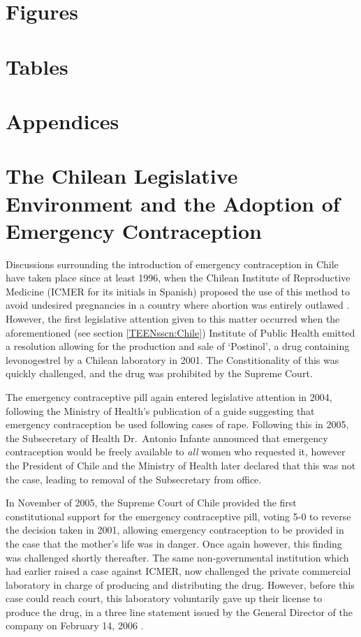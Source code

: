 \newpage
\section*{Figures}

\clearpage

\section*{Tables}

\newpage

\biblioinc

\newpage
\appendix
\section*{Appendices}
\section{The Chilean Legislative Environment and the Adoption of Emergency
Contraception}
\label{TEENscn:applegislate}
Discussions surrounding the introduction of emergency contraception in Chile
have taken place since at least 1996, when the Chilean Institute of 
Reproductive Medicine (ICMER for its initials in Spanish) proposed the use of
this method to avoid undesired pregnancies in a country where abortion was
entirely outlawed \citep{Dides2009}.  However, the first legislative attention
given to this matter occurred when the aforementioned (see section 
\ref{TEENsscn:Chile}) Institute of Public Health emitted a resolution allowing
for the production and sale of `Postinol', a drug containing levonogestrel by a
Chilean laboratory in 2001.  The Constitionality of this was quickly 
challenged, and the drug was prohibited by the Supreme Court.

The emergency contraceptive pill again entered legislative attention in 2004,
following the Ministry of Health's publication of a guide suggesting that 
emergency contraception be used following cases of rape.  Following this in 
2005, the Subsecretary of Health Dr.\ Antonio Infante announced that emergency
contraception would be freely available to \emph{all} women who requested it,
however the President of Chile and the Ministry of Health later declared that
this was not the case, leading to removal of the Subsecretary from office.

In November of 2005, the Supreme Court of Chile provided the first 
constitutional support for the emergency contraceptive pill, voting 5-0 to
reverse the decision taken in 2001, allowing emergency contraception to be
provided in the case that the mother's life was in danger.  Once again however,
this finding was challenged shortly thereafter.  The same non-governmental 
institution which had earlier raised a case against ICMER, now challenged the 
private commercial laboratory in charge of producing and distributing the drug.  
However, before this case could reach court, this laboratory voluntarily gave 
up their license to produce the drug, in a three line statement issued by the
General Director of the company on February 14, 2006 \citep{CasasBecerra2008}.

